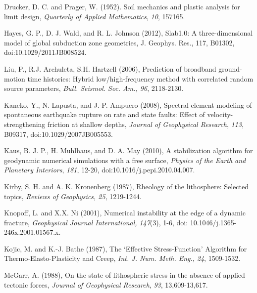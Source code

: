 \begin{thebibliography}{Bibliography}
Drucker, D.
  C. and Prager, W. (1952). Soil mechanics and plastic analysis for
  limit design, \textit{Quarterly of Applied Mathematics},
  \textit{10}, 157\textendash{}165.

Hayes, G. P., D. J. Wald,
  and R. L. Johnson (2012), Slab1.0: A three-dimensional model of
  global subduction zone geometries, J. Geophys. Res., 117, B01302,
  doi:10.1029/2011JB008524.

Liu, P., R.J. Archuleta,
  S.H. Hartzell (2006), Prediction of broadband ground-motion time
  histories: Hybrid low/high-frequency method with correlated random
  source parameters, \textit{Bull. Seismol. Soc. Am., 96}, 2118-2130.

Kaneko, Y., N. Lapusta,
  and J.-P. Ampuero (2008), Spectral element modeling of spontaneous
  earthquake rupture on rate and state faults: Effect of
  velocity-strengthening friction at shallow depths, \textit{Journal
    of Geophysical Research},\textit{ 113}, B09317,
  doi:10.1029/2007JB005553.

Kaus, B. J. P.,
  H. Muhlhaus, and D. A. May (2010), A stabilization algorithm for
  geodynamic numerical simulations with a free surface,
  \textit{Physics of the Earth and Planetary Interiors}, \textit{181},
  12-20, doi:10.1016/j.pepi.2010.04.007.

Kirby,
  S. H. and A. K. Kronenberg (1987), Rheology of the lithosphere:
  Selected topics, \textit{Reviews of Geophysics, 25}, 1219-1244.

Knopoff, L. and X.X.
  Ni (2001), Numerical instability at the edge of a dynamic fracture,
  \emph{Geophysical Journal International,}\textit{\emph{
  }}\textit{147}(3), 1-6, doi: 10.1046/j.1365-246x.2001.01567.x.

Kojic, M. and K.-J.
  Bathe (1987), The `Effective Stress-Function' Algorithm for
  Thermo-Elasto-Plasticity and Creep,
  \emph{Int. J. Num. Meth. Eng}.\emph{, 24}, 1509-1532.

McGarr, A. (1988), On the state of
  lithospheric stress in the absence of applied tectonic forces,
  \textit{Journal of Geophysical Research}, \textit{93},
  13,609-13,617.


\end{thebibliography}
